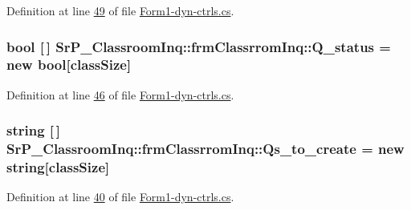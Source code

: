 \-Definition at line \hyperlink{_form1-dyn-ctrls_8cs_source_l00049}{49} of file \hyperlink{_form1-dyn-ctrls_8cs_source}{\-Form1-\/dyn-\/ctrls.\-cs}.

\hypertarget{class_sr_p___classroom_inq_1_1frm_classrrom_inq_ae02a7c8f440963717ee0cf2f74d4d56a}{
\subsubsection[{\-Q\-\_\-status}]{\setlength{\rightskip}{0pt plus 5cm}bool \mbox{[}$\,$\mbox{]} {\bf \-Sr\-P\-\_\-\-Classroom\-Inq\-::frm\-Classrrom\-Inq\-::\-Q\-\_\-status} = new bool\mbox{[}{\bf class\-Size}\mbox{]}}}
\label{class_sr_p___classroom_inq_1_1frm_classrrom_inq_ae02a7c8f440963717ee0cf2f74d4d56a}


\-Definition at line \hyperlink{_form1-dyn-ctrls_8cs_source_l00046}{46} of file \hyperlink{_form1-dyn-ctrls_8cs_source}{\-Form1-\/dyn-\/ctrls.\-cs}.

\hypertarget{class_sr_p___classroom_inq_1_1frm_classrrom_inq_a04ea330233515e3af7d23fcd501364cc}{
\subsubsection[{\-Qs\-\_\-to\-\_\-create}]{\setlength{\rightskip}{0pt plus 5cm}string \mbox{[}$\,$\mbox{]} {\bf \-Sr\-P\-\_\-\-Classroom\-Inq\-::frm\-Classrrom\-Inq\-::\-Qs\-\_\-to\-\_\-create} = new string\mbox{[}{\bf class\-Size}\mbox{]}}}
\label{class_sr_p___classroom_inq_1_1frm_classrrom_inq_a04ea330233515e3af7d23fcd501364cc}


\-Definition at line \hyperlink{_form1-dyn-ctrls_8cs_source_l00040}{40} of file \hyperlink{_form1-dyn-ctrls_8cs_source}{\-Form1-\/dyn-\/ctrls.\-cs}.

